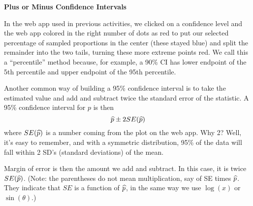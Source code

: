 \begin{center}
  {\Large \bf Plus or Minus Confidence Intervals}
\end{center}

In the web app used in previous activities, we clicked on a confidence
level and the web app colored in the right number of dots as red to
put our selected percentage of sampled proportions in the center
(these stayed blue) and split the remainder into the two tails,
turning these more extreme points red.  We call this a ``percentile''
method because, for example, a 90\% CI has lower endpoint of the 5th
percentile and upper endpoint of the 95th percentile.

Another common way of building a 95\% confidence interval is to take
the estimated value and add and subtract twice the standard error of
the statistic.  A 95\% confidence interval for $p$ is then
 $$ \widehat{p} \pm 2 SE(\widehat{p})$$
where $SE(\widehat{p})$ is a number coming from the plot on the web app.
Why 2?  Well, it's easy to remember, and with a symmetric
distribution, 95\% of the data will fall within 2 SD's (standard
deviations) of the mean.

Margin of error is then the amount we add and subtract.  In this case,
it is twice $SE(\widehat{p})$.  (Note: the parentheses do not mean
multiplication, say of SE times $\widehat{p}$. They indicate that $SE$ is a
function of $\widehat{p}$, in the same way we use $\log(x)$ or $\sin(\theta)$.)

